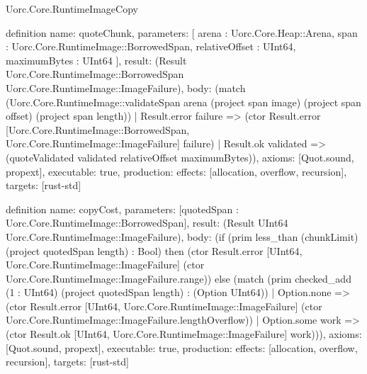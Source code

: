 \begin{lexlean}{Uorc.Core.RuntimeImageCopy}
\begin{semanticmodule}
definition{
  name: quoteChunk,
  parameters: [
    arena : Uorc.Core.Heap::Arena,
    span : Uorc.Core.RuntimeImage::BorrowedSpan,
    relativeOffset : UInt64,
    maximumBytes : UInt64
  ],
  result: (Result Uorc.Core.RuntimeImage::BorrowedSpan Uorc.Core.RuntimeImage::ImageFailure),
  body: (match (Uorc.Core.RuntimeImage::validateSpan arena (project span image) (project span offset) (project span length))
    | Result.error failure => (ctor Result.error [Uorc.Core.RuntimeImage::BorrowedSpan, Uorc.Core.RuntimeImage::ImageFailure] failure)
    | Result.ok validated => (quoteValidated validated relativeOffset maximumBytes)),
  axioms: [Quot.sound, propext],
  executable: true,
  production: {effects: [allocation, overflow, recursion], targets: [rust-std]}
}

definition{
  name: copyCost,
  parameters: [quotedSpan : Uorc.Core.RuntimeImage::BorrowedSpan],
  result: (Result UInt64 Uorc.Core.RuntimeImage::ImageFailure),
  body: (if (prim less_than (chunkLimit) (project quotedSpan length) : Bool) then (ctor Result.error [UInt64, Uorc.Core.RuntimeImage::ImageFailure] (ctor Uorc.Core.RuntimeImage::ImageFailure.range)) else (match (prim checked_add (1 : UInt64) (project quotedSpan length) : (Option UInt64))
    | Option.none => (ctor Result.error [UInt64, Uorc.Core.RuntimeImage::ImageFailure] (ctor Uorc.Core.RuntimeImage::ImageFailure.lengthOverflow))
    | Option.some work => (ctor Result.ok [UInt64, Uorc.Core.RuntimeImage::ImageFailure] work))),
  axioms: [Quot.sound, propext],
  executable: true,
  production: {effects: [allocation, overflow, recursion], targets: [rust-std]}
}


\end{semanticmodule}
\end{lexlean}
